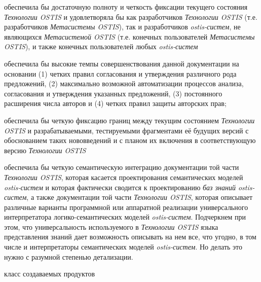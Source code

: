 \begin{scnsubstruct}
{        \begin{scnitemize}
            \item обеспечила бы достаточную полноту и четкость фиксации текущего состояния \textit{Технологии OSTIS} и удовлетворяла бы как разработчиков \textit{Технологии OSTIS} (т.е. разработчиков \textit{Метасистемы OSTIS}), так и разработчиков \textit{ostis-систем}, не являющихся \textit{Метасистемой OSTIS} (т.е. конечных пользователей \textit{Метасистемы OSTIS}), и также конечных пользователей любых \textit{ostis-систем}
            \item обеспечила бы высокие темпы совершенствования данной документации на основании (1) четких правил согласования и утверждения различного рода предложений, (2) максимально возможной автоматизации процессов анализа, согласования и утверждения указанных предложений, (3) постоянного расширения числа авторов и (4) четких правил защиты авторских прав;
            \item обеспечила бы четкую фиксацию границ между текущим состоянием \textit{Технологии OSTIS} и разрабатываемыми, тестируемыми фрагментами её будущих версий с обоснованием таких нововведений и с планом их включения в соответствующую версию \textit{Технологии OSTIS}
            \item обеспечила бы четкую семантическую интеграцию документации той части \textit{Технологии OSTIS}, которая касается проектирования семантических моделей \textit{ostis-систем} и которая фактически сводится к проектированию \textit{баз знаний ostis-систем}, а также документации той части \textit{Технологии OSTIS}, которая описывает различные варианты программной или аппаратной реализации универсального интерпретатора логико-семантических моделей \textit{ostis-систем}. Подчеркнем при этом, что универсальность используемого в \textit{Технологии OSTIS} языка представления знаний дает возможность описывать на нем все, что угодно, в том числе и интерпретаторы семантических моделей \textit{ostis-систем}. Но делать это нужно с разумной степенью детализации.
        \end{scnitemize}}
    \begin{scnrelfromlist}{класс создаваемых продуктов}
        \begin{scnindent}

\end{scnindent}
\end{scnrelfromlist}
\end{scnsubstruct}
